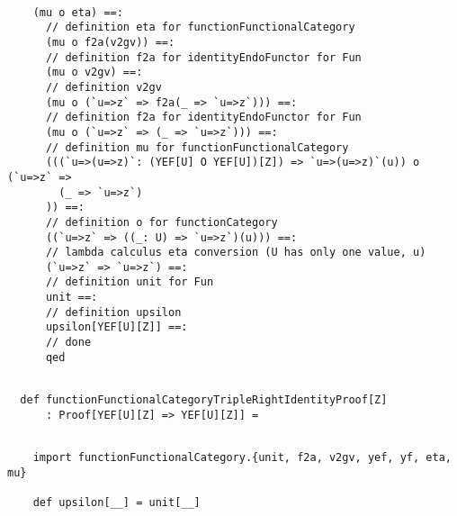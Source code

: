 \documentclass[11pt]{article}
\begin{document}
\begin{mdframed}[backgroundcolor=lightgray!20] 
\begin{lstlisting}     
    
    (mu o eta) ==:
      // definition eta for functionFunctionalCategory
      (mu o f2a(v2gv)) ==:
      // definition f2a for identityEndoFunctor for Fun
      (mu o v2gv) ==:
      // definition v2gv
      (mu o (`u=>z` => f2a(_ => `u=>z`))) ==:
      // definition f2a for identityEndoFunctor for Fun
      (mu o (`u=>z` => (_ => `u=>z`))) ==:
      // definition mu for functionFunctionalCategory
      (((`u=>(u=>z)`: (YEF[U] O YEF[U])[Z]) => `u=>(u=>z)`(u)) o (`u=>z` =>
        (_ => `u=>z`)
      )) ==:
      // definition o for functionCategory
      ((`u=>z` => ((_: U) => `u=>z`)(u))) ==:
      // lambda calculus eta conversion (U has only one value, u)
      (`u=>z` => `u=>z`) ==:
      // definition unit for Fun
      unit ==:
      // definition upsilon
      upsilon[YEF[U][Z]] ==:
      // done
      qed
\end{lstlisting}
\end{mdframed}
\vspace{6pt}
\begin{mdframed}[backgroundcolor=lightgray!20] 
\begin{lstlisting} 
  
  def functionFunctionalCategoryTripleRightIdentityProof[Z]
      : Proof[YEF[U][Z] => YEF[U][Z]] =
\end{lstlisting}
\end{mdframed}
\vspace{6pt}
\clearpage
\begin{mdframed}[backgroundcolor=lightgray!20] 
\begin{lstlisting}

    import functionFunctionalCategory.{unit, f2a, v2gv, yef, yf, eta, mu}

    def upsilon[__] = unit[__]
\end{lstlisting}
\end{mdframed}
\vspace{6pt}
\end{document}
